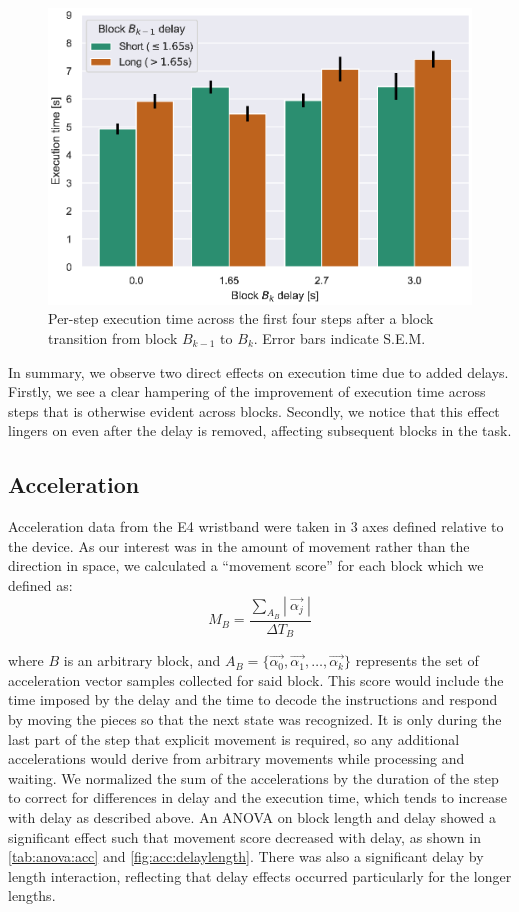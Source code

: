 \documentclass[10pt,letterpaper]{article}
\begin{document}
\begin{figure}[h]
  \centering
  \includegraphics[width=.8\textwidth]{plots/exec_time_delay_change.eps}
  \caption{Per-step execution time across the first four steps after a block transition from block \( B_{k-1} \) to \( B_k \). Error bars indicate S.E.M.}\label{fig:exectime:transition}%
\end{figure}

In summary, we observe two direct effects on execution time due to added delays.
Firstly, we see a clear hampering of the improvement of execution time across steps that is otherwise evident across blocks.
Secondly, we notice that this effect lingers on even after the delay is removed, affecting subsequent blocks in the task.

\subsection{Acceleration}

Acceleration data from the E4 wristband were taken in 3 axes defined relative to the device.
As our interest was in the amount of movement rather than the direction in space, we calculated a ``movement score'' for each block which we defined as:
\begin{equation}
    M_B = \frac{ \sum_{A_B} |\: \overrightarrow{\alpha_j} \:| }{\Delta T_{B}}
\end{equation}

where \( B \) is an arbitrary block, and \(A_{B} = \{ \overrightarrow{\alpha_0}, \overrightarrow{\alpha_1}, \ldots, \overrightarrow{\alpha_k} \} \) represents the set of acceleration vector samples collected for said block.
This score would include the time imposed by the delay and the time to decode the instructions and respond by moving the pieces so that the next state was recognized.
It is only during the last part of the step that explicit movement is required, so any additional accelerations would derive from arbitrary movements while processing and waiting.
We normalized the sum of the accelerations by the duration of the step to correct for differences in delay and the execution time, which tends to increase with delay as described above.
An ANOVA on block length and delay showed a significant effect such that movement score decreased with delay, as shown in \cref{tab:anova:acc} and \cref{fig:acc:delaylength}.
There was also a significant delay by length interaction, reflecting that delay effects occurred particularly for the longer lengths.
\end{document}
